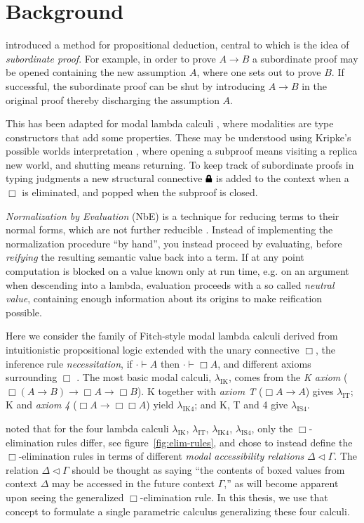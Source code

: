 \documentclass{article}
\theoremstyle{definition}\newtheorem{definition}{Definition}
\newcommand{\lock}{\text{\tikz[baseline]{
      \fill[rounded corners=.1ex] (-.75ex,0) rectangle (.75ex,1ex);
      \draw[line width=.3ex] (-.4ex,.5ex) -- ++(0,.75ex) arc (180:0:.4ex) -- ++(0,-.75ex);
}}}
\begin{document}
\section{Background}

\textcite{fitch52} introduced a method for propositional deduction,
central to which is the idea of \emph{subordinate proof}.
For example, in order to prove $A \rightarrow B$ a subordinate proof may be opened
containing the new assumption $A$, where one sets out to prove $B$.
If successful, the subordinate proof can be shut
by introducing $A \rightarrow B$ in the original proof
thereby discharging the assumption $A$.

This has been adapted for modal lambda calculi \cite{borghuis94},
where modalities are type constructors that add some properties.
These may be understood using Kripke's possible worlds interpretation \cite{kripke63, huth04},
where opening a subproof means visiting a replica new world,
and shutting means returning.
To keep track of subordinate proofs in typing judgments
a new structural connective $\lock$ is added to the context when a $\Box$ is eliminated,
and popped when the subproof is closed.

\emph{Normalization by Evaluation} (NbE) is a technique for reducing terms to their normal forms,
which are not further reducible \cite{berger91}.
Instead of implementing the normalization procedure ``by hand'',
you instead proceed by evaluating,
before \emph{reifying} the resulting semantic value back into a term.
If at any point computation is blocked on a value known only at run time,
e.g. on an argument when descending into a lambda,
evaluation proceeds with a so called \emph{neutral value},
containing enough information about its origins to make reification possible.

Here we consider the family of Fitch-style modal lambda calculi
derived from intuitionistic propositional logic
extended with the unary connective $\Box$,
the inference rule \emph{necessitation},
if $\cdot \vdash A$ then $\cdot \vdash \Box A$,
and different axioms surrounding $\Box$ \cite{clouston18}.
The most basic modal calculi, $\lambda_\text{IK}$,
comes from the \emph{K axiom}
($\Box(A \rightarrow B) \rightarrow \Box A \rightarrow \Box B$).
K together with \emph{axiom T} ($\Box A \rightarrow A$) gives $\lambda_\text{IT}$;
K and \emph{axiom 4} ($\Box A \rightarrow \Box\Box A$) yield $\lambda_\text{IK4}$;
and K, T and 4 give $\lambda_\text{IS4}$.

\textcite{valliappan22} noted that for the four lambda calculi
$\lambda_\text{IK}$, $\lambda_\text{IT}$, $\lambda_\text{IK4}$, $\lambda_\text{IS4}$,
only the $\Box$-elimination rules differ,
see figure~\ref{fig:elim-rules},
and chose to instead define the $\Box$-elimination rules
in terms of different \emph{modal accessibility relations} $\Delta\lhd\Gamma$.
The relation $\Delta\lhd\Gamma$ should be thought as saying
``the contents of boxed values from context $\Delta$ may be accessed in the future context $\Gamma$,''
as will become apparent upon seeing the generalized $\Box$-elimination rule.
In this thesis, we use that concept to formulate
a single parametric calculus generalizing these four calculi.
\end{document}
